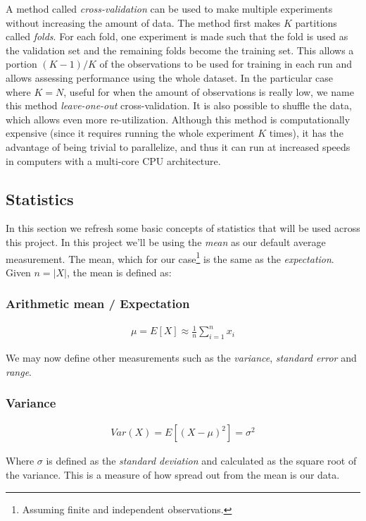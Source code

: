 A method called \emph{cross-validation} can be used to make mul\-ti\-ple experiments with\-out increasing the amount of data. The method first makes $K$ partitions called \emph{folds}. For each fold, one experiment is made such that the fold is used as the validation set and the remaining folds become the training set. This allows a portion $(K-1)/K$ of the observations to be used for training in each run and allows assessing performance using the whole dataset. In the particular case where $K = N$, useful for when the amount of observations is really low, we name this method \emph{leave-one-out} cross-validation. It is also possible to shuffle the data, which allows even more re-utilization. Although this method is computationally expensive (since it requires running the whole experiment $K$ times), it has the advantage of being trivial to parallelize, and thus it can run at increased speeds in computers with a multi-core CPU architecture. 

\subsection{Statistics}
\label{sec:ch4.statistics}

In this section we refresh some basic concepts of statistics that will be used across this project. In this project we'll be using the \emph{mean} as our default average measurement. The mean, which for our case\footnote{Assuming finite and independent observations.} is the same as the \emph{expectation}. Given $n = |X|$, the mean is defined as:

\subsubsection*{Arithmetic mean / Expectation }
\begin{align*}
    \mu = E[X] \approx \frac{1}{n} \sum_{i = 1}^{n} x_i
\end{align*}

We may now define other measurements such as the \emph{variance}, \emph{standard error} and \emph{range}.

\subsubsection*{Variance}
\begin{align*}
    Var(X) = E[(X - \mu)^2] = \sigma^2
\end{align*}

Where $\sigma$ is defined as the \emph{standard deviation} and calculated as the square root of the variance. This is a measure of how spread out from the mean is our data.

